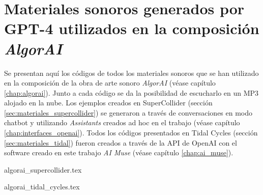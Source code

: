 \chapter{Materiales sonoros generados por GPT-4 utilizados en la composición \emph{AlgorAI}}
\label{anexo:algorai}

Se presentan aquí los códigos de todos los materiales sonoros que se han utilizado en la composición de la obra de arte sonoro \emph{AlgorAI} (véase capítulo \ref{chap:algorai}). Junto a cada código se da la posibilidad de escucharlo en un MP3 alojado en la nube. Los ejemplos creados en SuperCollider (sección \ref{sec:materiales_supercollider}) se generaron a través de conversaciones en modo chatbot y utilizando \emph{Assistants} creados ad hoc en el trabajo (véase capítulo \ref{chap:interfaces_openai}). Todos los códigos presentados en Tidal Cycles (sección \ref{sec:materiales_tidal}) fueron creados a través de la API de OpenAI con el software creado en este trabajo \emph{AI Muse} (véase capítulo \ref{chap:ai_muse}).

{algorai_supercollider.tex}

{algorai_tidal_cycles.tex}


